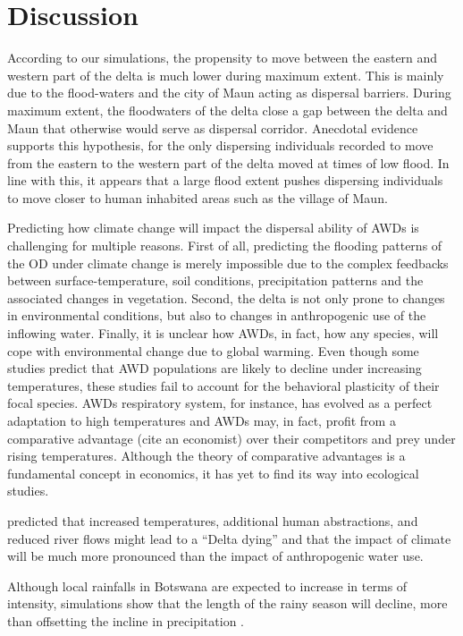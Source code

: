 \documentclass[abstract=on,10pt,a4paper,bibliography=totocnumbered]{article}
\begin{document}
% 
% 
% 

\section{Discussion}
According to our simulations, the propensity to move between the eastern and
western part of the delta is much lower during maximum extent. This is mainly
due to the flood-waters and the city of Maun acting as dispersal barriers.
During maximum extent, the floodwaters of the delta close a gap between the
delta and Maun that otherwise would serve as dispersal corridor. Anecdotal
evidence supports this hypothesis, for the only dispersing individuals recorded
to move from the eastern to the western part of the delta moved at times of low
flood. In line with this, it appears that a large flood extent pushes dispersing
individuals to move closer to human inhabited areas such as the village of Maun.

Predicting how climate change will impact the dispersal ability of AWDs is
challenging for multiple reasons. First of all, predicting the flooding patterns
of the OD under climate change is merely impossible due to the complex feedbacks
between surface-temperature, soil conditions, precipitation patterns and the
associated changes in vegetation. Second, the delta is not only prone to changes
in environmental conditions, but also to changes in anthropogenic use of the
inflowing water. Finally, it is unclear how AWDs, in fact, how any
species, will cope with environmental change due to global warming. Even though
some studies predict that AWD populations are likely to decline under increasing
temperatures, these studies fail to account for the behavioral plasticity of
their focal species. AWDs respiratory system, for instance, has evolved as a
perfect adaptation to high temperatures and AWDs may, in fact, profit from a
comparative advantage (cite an economist) over their competitors and prey under
rising temperatures. Although the theory of comparative advantages is a
fundamental concept in economics, it has yet to find its way into ecological
studies.

\cite{Murray-Hudson.2006} predicted that increased temperatures, additional human
abstractions, and reduced river flows might lead to a ``Delta dying'' and that
the impact of climate will be much more pronounced than the impact of
anthropogenic water use.

Although local rainfalls in Botswana are expected to increase in terms of
intensity, simulations show that the length of the rainy season will decline,
more than offsetting the incline in precipitation \cite{Akinyemi.2019}.
\end{document}

